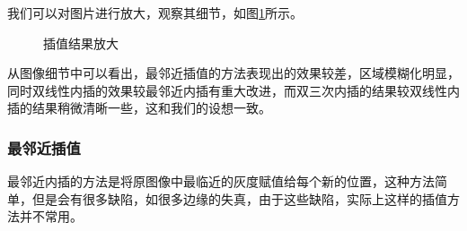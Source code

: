 \documentclass[UTF8]{ctexart}
\begin{document}
我们可以对图片进行放大，观察其细节，如图\ref{interpolation_result2}所示。

\begin{figure}[h!]
	\centering
	\hspace{0.1in} 
	\hspace{0.1in} 
	\caption{插值结果放大} 
	\label{interpolation_result2} %
\end{figure}

从图像细节中可以看出，最邻近插值的方法表现出的效果较差，区域模糊化明显，同时双线性内插的效果较最邻近内插有重大改进，而双三次内插的结果较双线性内插的结果稍微清晰一些，这和我们的设想一致。

\subsubsection{最邻近插值}

最邻近内插的方法是将原图像中最临近的灰度赋值给每个新的位置，这种方法简单，但是会有很多缺陷，如很多边缘的失真，由于这些缺陷，实际上这样的插值方法并不常用。
\end{document}

